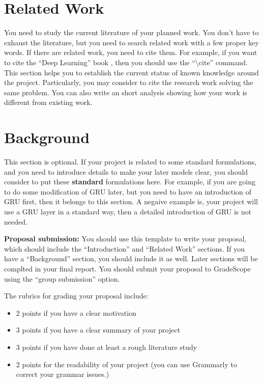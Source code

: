 \documentclass[11pt]{article}
\begin{document}
\section{Related Work}

You need to study the current literature of your planned work. You don't have to exhaust the literature, but you need to search related work with a few proper key words. If there are related work, you need to cite them. For example, if you want to cite the ``Deep Learning'' book \cite{goodfellow2016deep}, then you should use the ``\textbackslash cite'' command. This section helps you to establish the current status of known knowledge around the project. Particularly, you may consider to cite the research work solving the same problem. You can also write an short analysis showing how your work is different from existing work. 

\section{Background}

This section is optional. If your project is related to some standard formulations, and you need to introduce details to make your later models clear, you should consider to put these \textbf{standard} formulations here.  For example, if you are going to do some modification of GRU later, but you need to have an introduction of GRU first, then it belongs to this section. A negaive example is, your project will use a GRU layer in a standard way, then a detailed introduction of GRU is not needed. 


\noindent \textbf{Proposal submission:} You should use this template to write your proposal, which should include the ``Introduction'' and ``Related Work'' sections. If you have a ``Background'' section, you should include it as well. Later sections will be complted in your final report. You should submit your proposal to GradeScope using the ``group submission'' option. 

The rubrics for grading your proposal include: 
\begin{itemize}
\item 2 points if you have a clear motivation
\item 3 points if you have a clear summary of your project 
\item 3 points if you have done at least a rough literature study 
\item 2 points for the readability of your project (you can use Grammarly to correct your grammar issues.) 
\end{itemize}
\end{document}
